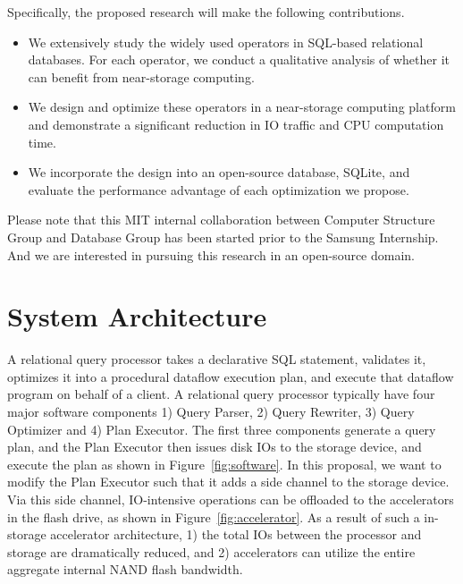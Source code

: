 \documentclass{article}
\begin{document}
Specifically, the proposed research will make the following contributions.

\begin{itemize}
\item We extensively study the widely used operators in SQL-based relational databases. For each operator, we conduct a qualitative analysis of whether it can benefit from near-storage computing. 

\item We design and optimize these operators in a near-storage computing platform and demonstrate a significant reduction in IO traffic and CPU computation time. 

\item We incorporate the design into an open-source database, SQLite, and evaluate the performance advantage of each optimization we propose. 
\end{itemize}

Please note that this MIT internal collaboration between Computer Structure Group and Database Group has been started prior to the Samsung Internship. And we are interested in pursuing this research in an open-source domain.


\section{System Architecture}

A relational query processor takes a declarative SQL statement, validates it, optimizes it into a procedural dataflow execution plan, and execute that dataflow program on behalf of a client.
A relational query processor typically have four major software components 1) Query Parser, 2) Query Rewriter, 3) Query Optimizer and 4) Plan Executor.
The first three components generate a query plan, and the Plan Executor then issues disk IOs to the storage device, and execute the plan as shown in Figure~\ref{fig:software}.
In this proposal, we want to modify the Plan Executor such that it adds a side channel to the storage device.
Via this side channel, IO-intensive operations can be offloaded to the accelerators in the flash drive, as shown in Figure~\ref{fig:accelerator}.
As a result of such a in-storage accelerator architecture, 1) the total IOs between the processor and storage are dramatically reduced, and 2) accelerators can utilize the entire aggregate internal NAND flash bandwidth.
\end{document}
